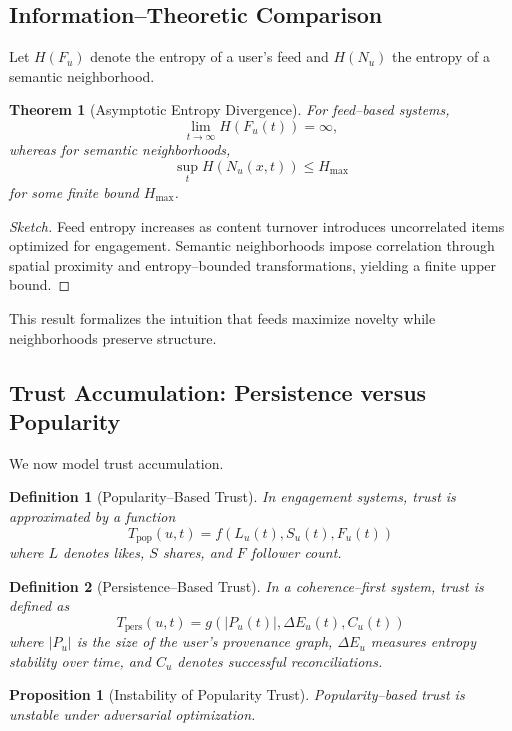 \documentclass[11pt]{article}
\newtheorem{definition}{Definition}
\newtheorem{proposition}{Proposition}
\newtheorem{theorem}{Theorem}
\begin{document}
\subsection{Information--Theoretic Comparison}

Let $H(F_u)$ denote the entropy of a user’s feed and $H(N_u)$ the entropy of a semantic
neighborhood.

\begin{theorem}[Asymptotic Entropy Divergence]
For feed--based systems,
\[
\lim_{t \to \infty} H(F_u(t)) = \infty,
\]
whereas for semantic neighborhoods,
\[
\sup_t H(N_u(x,t)) \le H_{\max}
\]
for some finite bound $H_{\max}$.
\end{theorem}

\begin{proof}[Sketch]
Feed entropy increases as content turnover introduces uncorrelated items optimized for
engagement. Semantic neighborhoods impose correlation through spatial proximity and
entropy--bounded transformations, yielding a finite upper bound.
\end{proof}

This result formalizes the intuition that feeds maximize novelty while neighborhoods
preserve structure.

\subsection{Trust Accumulation: Persistence versus Popularity}

We now model trust accumulation.

\begin{definition}[Popularity--Based Trust]
In engagement systems, trust is approximated by a function
\[
T_{\text{pop}}(u,t) = f(L_u(t), S_u(t), F_u(t))
\]
where $L$ denotes likes, $S$ shares, and $F$ follower count.
\end{definition}

\begin{definition}[Persistence--Based Trust]
In a coherence--first system, trust is defined as
\[
T_{\text{pers}}(u,t) = g(|P_u(t)|, \Delta E_u(t), C_u(t))
\]
where $|P_u|$ is the size of the user’s provenance graph, $\Delta E_u$ measures entropy
stability over time, and $C_u$ denotes successful reconciliations.
\end{definition}

\begin{proposition}[Instability of Popularity Trust]
Popularity--based trust is unstable under adversarial optimization.
\end{proposition}
\end{document}
